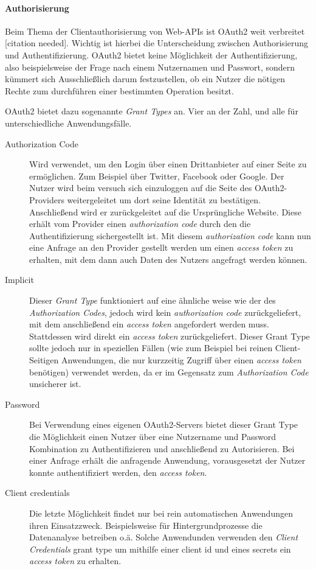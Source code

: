 \documentclass[12pt,a4paper,bibliography=totocnumbered,listof=totocnumbered]{scrartcl}
\begin{document}
\paragraph{Authorisierung}

Beim Thema der Clientauthorisierung von Web-\acp{API} ist OAuth2 weit verbreitet [citation needed]. Wichtig ist hierbei die Unterscheidung zwischen Authorisierung und Authentifizierung. OAuth2 bietet keine Möglichkeit der Authentifizierung, also beispielsweise der Frage nach einem Nutzernamen und Passwort, sondern kümmert sich Ausschließlich darum festzustellen, ob ein Nutzer die nötigen Rechte zum durchführen einer bestimmten Operation besitzt.\cite{degges}

OAuth2 bietet dazu sogenannte \textit{Grant Types} an. Vier an der Zahl, und alle für unterschiedliche Anwendungsfälle.

\begin{description}  
	\item [Authorization Code] Wird verwendet, um den Login über einen Drittanbieter auf einer Seite zu ermöglichen. Zum Beispiel über Twitter, Facebook oder Google. Der Nutzer wird beim versuch sich einzuloggen auf die Seite des OAuth2-Providers weitergeleitet um dort seine Identität zu bestätigen. Anschließend wird er zurückgeleitet auf die Ursprüngliche Website. Diese erhält vom Provider einen \textit{authorization code} durch den die Authentifizierung sichergestellt ist. Mit diesem \textit{authorization code} kann nun eine Anfrage an den Provider gestellt werden um einen \textit{access token} zu erhalten, mit dem dann auch Daten des Nutzers angefragt werden können.\cite{degges}
	\item [Implicit] Dieser \textit{Grant Type} funktioniert auf eine ähnliche weise wie der des \textit{Authorization Codes}, jedoch wird kein \textit{authorization code} zurückgeliefert, mit dem anschließend ein \textit{access token} angefordert werden muss. Stattdessen wird direkt ein \textit{access token} zurückgeliefert.\cite{degges} Dieser Grant Type sollte jedoch nur in speziellen Fällen (wie zum Beispiel bei reinen Client-Seitigen Anwendungen, die nur kurzzeitig Zugriff über einen \textit{access token} benötigen) verwendet werden, da er im Gegensatz zum \textit{Authorization Code} unsicherer ist.
	\item [Password] Bei Verwendung eines eigenen OAuth2-Servers bietet dieser Grant Type die Möglichkeit einen Nutzer über eine Nutzername und Password Kombination zu Authentifizieren und anschließend zu Autorisieren. Bei einer Anfrage erhält die anfragende Anwendung, vorausgesetzt der Nutzer konnte authentifiziert werden, den \textit{access token}.\cite{degges}
	\item [Client credentials] Die letzte Möglichkeit findet nur bei rein automatischen Anwendungen ihren Einsatzzweck. Beispielsweise für Hintergrundprozesse die Datenanalyse betreiben o.ä. Solche Anwendunden verwenden den \textit{Client Credentials} grant type um mithilfe einer client id und eines secrets ein \textit{access token} zu erhalten.\cite{degges}
\end{description}
\end{document}
